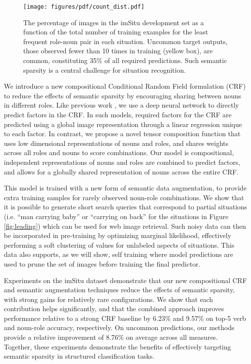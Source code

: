 \documentclass[10pt,twocolumn,letterpaper]{article}
\begin{document}
\begin{figure}[t]
\centering
\texttt{[image: figures/pdf/count\_dist.pdf]}
\caption{\small The percentage of images in the imSitu development set as a function of the total number of training examples for the least frequent role-noun pair in each situation.
Uncommon target outputs, those observed fewer than 10 times in training (yellow box), are common, constituting 35\% of all required predictions. Such semantic sparsity is a central challenge for situation recognition. }
\label{fig:freq}
\end{figure}

We introduce a new compositional Conditional Random Field formulation (CRF) to reduce the effects of semantic sparsity by encouraging sharing between nouns in different roles. 
Like previous work \cite{yatskar2016}, we use a deep neural network to directly predict factors in the CRF.
In such models, required factors for the CRF are predicted using a global image representation through a linear regression unique to each factor.  
In contrast, we propose a novel tensor composition function that uses low dimensional representations of nouns and roles, and shares weights across all roles and nouns to score combinations.
Our model is compositional, independent representations of nouns and roles are combined to predict factors, and allows for a globally shared representation of nouns across the entire CRF.

This model is trained with a new form of semantic data augmentation, to provide extra training samples for rarely observed noun-role combinations. 
We show that it is possible to generate short search queries that correspond to partial situations (i.e. ``man carrying baby'' or ``carrying on back'' for the situations in Figure \ref{fig:leading}) which can be used for web image retrieval.
Such noisy data can then be incorporated in pre-training by optimizing marginal likelihood, effectively performing a soft clustering of values for unlabeled aspects of situations.
This data also supports, as we will show, self training where model predictions are used to prune the set of images before training the final predictor. 


Experiments on the imSitu dataset \cite{yatskar2016} demonstrate that our new compositional CRF and semantic augmentation techniques reduce the effects of semantic sparsity, with  strong gains for relatively rare configurations. 
We show that each contribution helps significantly, and that the combined approach improves performance relative to a strong CRF baseline by 6.23\% and 9.57\% on top-5 verb and noun-role accuracy, respectively. On uncommon predictions, our methods provide a relative improvement of 8.76\% on average across all measures. Together, these experiments demonstrate the benefits of effectively targeting semantic sparsity in structured classification tasks.
\end{document}
